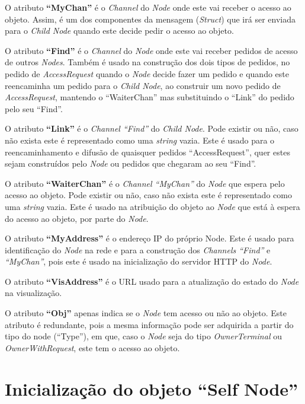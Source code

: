 O atributo \textbf{``MyChan''} é o \emph{Channel} do \emph{Node} onde este vai receber o acesso ao objeto.
Assim, é um dos componentes da mensagem (\emph{Struct}) que irá ser enviada para o \emph{Child Node} quando este decide pedir o acesso ao objeto.

O atributo \textbf{``Find''} é o \emph{Channel} do \emph{Node} onde este vai receber pedidos de acesso de outros \emph{Nodes}. 
Também é usado na construção dos dois tipos de pedidos, no pedido de \emph{AccessRequest} quando o \emph{Node} decide fazer um pedido e quando este reencaminha um pedido para o \emph{Child Node}, ao construir um novo pedido de \emph{AccessRequest}, mantendo o ``WaiterChan'' mas substituindo o ``Link'' do pedido pelo seu ``Find''.

O atributo \textbf{``Link''} é o \emph{Channel ``Find''} do \emph{Child Node}. Pode existir ou não, caso não exista este é representado como uma \emph{string} vazia.
Este é usado para o reencaminhamento e difusão de quaisquer pedidos ``AccessRequest'', quer estes sejam construídos pelo \emph{Node} ou pedidos que chegaram ao seu ``Find''.

O atributo \textbf{``WaiterChan''} é o \emph{Channel ``MyChan''} do \emph{Node} que espera pelo acesso ao objeto. Pode existir ou não, caso não exista este é representado como uma \emph{string} vazia.
Este é usado na atribuição do objeto ao \emph{Node} que está à espera do acesso ao objeto, por parte do \emph{Node}.

O atributo \textbf{``MyAddress''} é o endereço \acs{IP} do próprio Node. 
Este é usado para identificação do \emph{Node} na rede e para a construção dos \emph{Channels ``Find''} e \emph{``MyChan''},
pois este é usado na inicialização do servidor \acs{HTTP} do \emph{Node}.

O atributo \textbf{``VisAddress''} é o \acs{URL} usado para a atualização do estado do \emph{Node} na visualização.

O atributo \textbf{``Obj''} apenas indica se o \emph{Node} tem acesso ou não ao objeto.
Este atributo é redundante, pois a mesma informação pode ser adquirida a partir do tipo do node (``Type''), 
em que, caso o \emph{Node} seja do tipo \emph{OwnerTerminal} ou \emph{OwnerWithRequest}, este tem o acesso ao objeto.


\section{Inicialização do objeto ``Self Node''}


